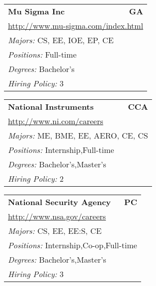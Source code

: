 \documentclass[twoside]{article}
\begin{document}
\begin{center}
\begin{multicols}{3}
\begin{FlushLeft}
\begin{minipage}{.9\columnwidth}
\end{minipage}
 
\begin{minipage}{.9\columnwidth}\begin{tabularx}{.95\columnwidth}{Xr}
                 {\Large\bf Mu Sigma Inc} & {\Large\bf GA}\\
    \multicolumn{2}{p{.95\columnwidth}}{\url{http://www.mu-sigma.com/index.html}}\\
    \multicolumn{2}{p{.95\columnwidth}}{\emph{Majors:} CS, EE, IOE, EP, CE}\\
    \multicolumn{2}{p{.95\columnwidth}}{\emph{Positions:} Full-time}\\
    \multicolumn{2}{p{.95\columnwidth}}{\emph{Degrees:} Bachelor's}\\
    \multicolumn{2}{p{.95\columnwidth}}{\emph{Hiring Policy:} 3}\\
    \end{tabularx}
    
\end{minipage}
 
\begin{minipage}{.9\columnwidth}\begin{tabularx}{.95\columnwidth}{Xr}
                 {\Large\bf National Instruments} & {\Large\bf CCA}\\
    \multicolumn{2}{p{.95\columnwidth}}{\url{http://www.ni.com/careers}}\\
    \multicolumn{2}{p{.95\columnwidth}}{\emph{Majors:} ME, BME, EE, AERO, CE, CS}\\
    \multicolumn{2}{p{.95\columnwidth}}{\emph{Positions:} Internship,Full-time}\\
    \multicolumn{2}{p{.95\columnwidth}}{\emph{Degrees:} Bachelor's,Master's}\\
    \multicolumn{2}{p{.95\columnwidth}}{\emph{Hiring Policy:} 2}\\
    \end{tabularx}
    
\end{minipage}
 
\begin{minipage}{.9\columnwidth}\begin{tabularx}{.95\columnwidth}{Xr}
                 {\Large\bf National Security Agency} & {\Large\bf PC}\\
    \multicolumn{2}{p{.95\columnwidth}}{\url{http://www.nsa.gov/careers}}\\
    \multicolumn{2}{p{.95\columnwidth}}{\emph{Majors:} CS, EE, EE:S, CE}\\
    \multicolumn{2}{p{.95\columnwidth}}{\emph{Positions:} Internship,Co-op,Full-time}\\
    \multicolumn{2}{p{.95\columnwidth}}{\emph{Degrees:} Bachelor's,Master's}\\
    \multicolumn{2}{p{.95\columnwidth}}{\emph{Hiring Policy:} 3}\\
    \end{tabularx}
    

\end{minipage}
\end{FlushLeft}
\end{multicols}
\end{center}
\end{document}
